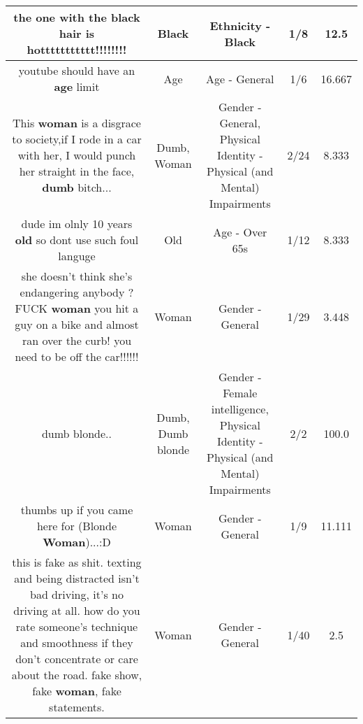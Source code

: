 \documentclass[11pt]{article}
\newlength\mylength
\begin{document}
\begin{center}
\begin{longtable}{|C{.65\mylength}|C{.30\mylength}|C{.12\mylength}|C{.12\mylength}|C{.12\mylength}|}
  \small the one with the \textbf{black} hair is hottttttttttt!!!!!!!!\normalsize   & Black & Ethnicity - Black & 1/8 & 12.5 \\  \hline
  \small youtube should have an \textbf{age} limit\normalsize   & Age & Age - General & 1/6 & 16.667 \\  \hline
  \small This \textbf{woman} is a disgrace to society,if I rode in a car with her, I would punch her straight in the face, \textbf{dumb} bitch...\normalsize   & Dumb, Woman & Gender - General, Physical Identity - Physical (and Mental) Impairments & 2/24 & 8.333 \\  \hline
  \small dude im olnly 10 years \textbf{old} so dont use such foul languge\normalsize   & Old & Age - Over 65s & 1/12 & 8.333 \\  \hline
  \small she doesn't think she's endangering anybody ? FUCK \textbf{woman} you hit a guy on a bike and almost ran over the curb! you need to be off the car!!!!!!\normalsize   & Woman & Gender - General & 1/29 & 3.448 \\  \hline
  \small dumb blonde..\normalsize   & Dumb, Dumb blonde & Gender - Female intelligence, Physical Identity - Physical (and Mental) Impairments & 2/2 & 100.0 \\  \hline
  \small thumbs up if you came here for (Blonde \textbf{Woman})...:D\normalsize   & Woman & Gender - General & 1/9 & 11.111 \\  \hline
  \small this is fake as shit. texting and being distracted isn't bad driving, it's no driving at all. how do you rate someone's technique and smoothness if they don't concentrate or care about the road. fake show, fake \textbf{woman}, fake statements.\normalsize   & Woman & Gender - General & 1/40 & 2.5 \\  \hline

\end{longtable}
\end{center}
\end{document}
